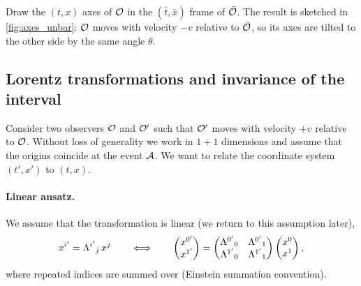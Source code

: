 \begin{exercise}
    Draw the $(t, x)$ axes of $\mathcal{O}$ in the $(\bar{t}, \bar{x})$ frame of $\bar{\mathcal{O}}$.
    The result is sketched in \cref{fig:axes_unbar}: $\mathcal{O}$ moves with velocity $-v$ relative to
    $\bar{\mathcal{O}}$, so its axes are tilted to the other side by the same angle $\theta$.
\end{exercise}

\subsection{Lorentz transformations and invariance of the interval}
\label{sec:sr_lorentz}

Consider two observers $\mathcal{O}$ and $\mathcal{O}'$ such that $\mathcal{O}'$ moves with velocity $+v$ relative to
$\mathcal{O}$. Without loss of generality we work in $1+1$ dimensions and assume that the origins
coincide at the event $\mathcal{A}$. We want to relate the coordinate system $(t', x')$ to $(t, x)$.

\paragraph{Linear ansatz.}
We assume that the transformation is linear (we return to this assumption later),
\begin{equation}
    x^{i'} = \Lambda^{i'}{}_{j}\, x^j
    \qquad\Longleftrightarrow\qquad
    \begin{pmatrix} x^{0'} \\ x^{1'} \end{pmatrix}
    =
    \begin{pmatrix} \Lambda^{0'}{}_{0} & \Lambda^{0'}{}_{1} \\ \Lambda^{1'}{}_{0} & \Lambda^{1'}{}_{1} \end{pmatrix}
    \begin{pmatrix} x^{0} \\ x^{1} \end{pmatrix} ,
    \label{eq:linear_ansatz}
\end{equation}
where repeated indices are summed over (Einstein summation convention).

